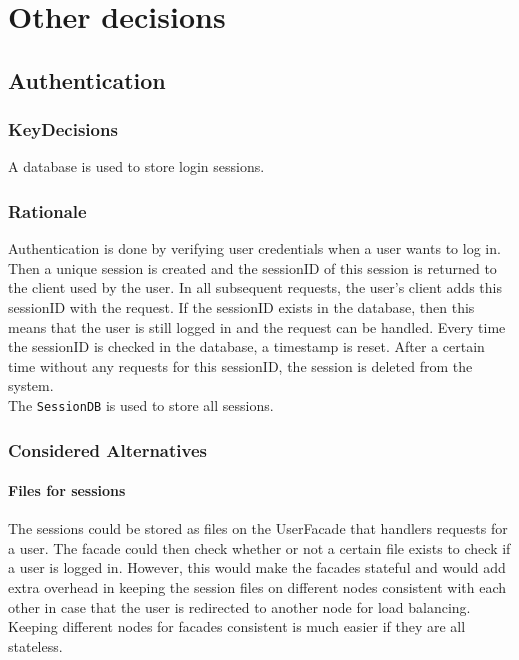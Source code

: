 

\newpage

\newpage

\newpage

\newpage

\newpage

\newpage


\section{Other decisions}

    \subsection{Authentication}
        \subsubsection*{KeyDecisions}
            A database is used to store login sessions.

        \subsubsection*{Rationale}
            Authentication is done by verifying user credentials when a user wants to log in. Then a unique session
            is created and the sessionID of this session is returned to the client used by the user. In all subsequent requests,
            the user's client adds this sessionID with the request. If the sessionID exists in the database, then this means
            that the user is still logged in and the request can be handled. Every time the sessionID is checked in the database,
            a timestamp is reset. After a certain time without any requests for this sessionID, the session is deleted from the system. \\

            The \texttt{SessionDB} is used to store all sessions.

        \subsubsection*{Considered Alternatives}
            \paragraph{Files for sessions}
                The sessions could be stored as files on the UserFacade that handlers requests for a user. The facade could then check
                whether or not a certain file exists to check if a user is logged in. However, this would make the facades stateful and
                would add extra overhead in keeping the session files on different nodes consistent with each other in case that the
                user is redirected to another node for load balancing. Keeping different nodes for facades consistent is much easier
                if they are all stateless.

